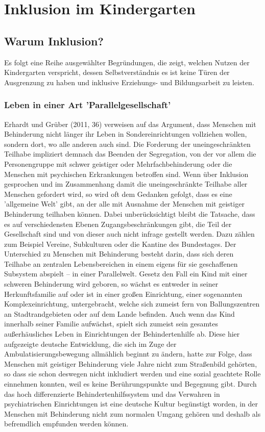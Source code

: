 \chapter{Inklusion im Kindergarten}

\section{Warum Inklusion?}
\label{sec:Why}
Es folgt eine Reihe ausgewählter Begründungen, die zeigt, welchen Nutzen der Kindergarten verspricht, dessen Selbstverständnis es ist keine Türen der Ausgrenzung zu haben und inklusive Erziehungs- und Bildungsarbeit zu leisten. 

\subsection{Leben in einer Art 'Parallelgesellschaft'}
Erhardt und Grüber (2011, 36) verweisen auf das Argument, dass Menschen mit Behinderung nicht länger ihr Leben in Sondereinrichtungen vollziehen wollen, sondern dort, wo alle anderen auch sind. Die Forderung der uneingeschränkten Teilhabe impliziert demnach das Beenden der Segregation, von der vor allem die Personengruppe mit schwer geistiger oder Mehrfachbehinderung oder die Menschen mit psychischen Erkrankungen betroffen sind. Wenn über Inklusion gesprochen und im Zusammenhang damit die uneingeschränkte Teilhabe aller Menschen gefordert wird, so wird oft dem Gedanken gefolgt, dass es eine 'allgemeine Welt' gibt, an der alle mit Ausnahme der Menschen mit geistiger Behinderung teilhaben können. Dabei unberücksichtigt bleibt die Tatsache, dass es auf verschiedensten Ebenen Zugangsbeschränkungen gibt, die Teil der Gesellschaft sind und von dieser auch nicht infrage gestellt werden. Dazu zählen zum Beispiel Vereine, Subkulturen oder die Kantine des Bundestages. Der Unterschied zu Menschen mit Behinderung besteht darin, dass sich deren Teilhabe an zentralen Lebensbereichen in einem eigens für sie geschaffenen Subsystem abspielt -- in einer Parallelwelt.
Gesetz den Fall ein Kind mit einer schweren Behinderung wird geboren, so wächst es entweder in seiner Herkunftsfamilie auf oder ist in einer großen Einrichtung, einer sogenannten Komplexeinrichtung, untergebracht, welche sich zumeist fern von Ballungszentren an Stadtrandgebieten oder auf dem Lande befinden. Auch wenn das Kind  innerhalb seiner Familie aufwächst, spielt sich zumeist sein gesamtes außerhäusliches Leben in Einrichtungen der Behindertenhilfe ab. Diese hier aufgezeigte deutsche Entwicklung, die sich im Zuge der Ambulatisierungsbewegung allmählich beginnt zu ändern, hatte zur Folge, dass Menschen mit geistiger Behinderung viele Jahre nicht zum Straßenbild gehörten, so dass sie schon deswegen nicht inkludiert werden und eine sozial geachtete Rolle einnehmen konnten, weil es keine Berührungspunkte und Begegnung gibt. Durch das hoch differenzierte Behindertenhilfssystem und das Verwahren in psychiatrischen Einrichtungen ist eine deutsche Kultur begünstigt worden, in der Menschen mit Behinderung nicht zum normalen Umgang gehören und deshalb als befremdlich empfunden werden können.
